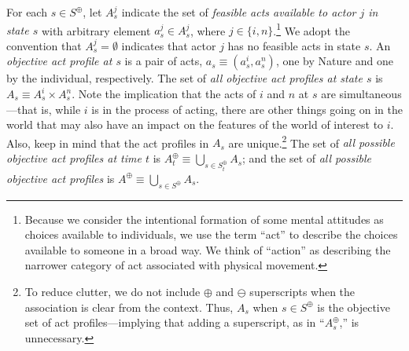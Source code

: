 \documentclass[
11pt,
titlepage,
reqno,
]{article}%
\theoremstyle{definition}
\begin{document}
For each  $s\in S^\oplus$, let $A^j_s$ indicate the set of \textit{feasible acts available to actor $j$ in state $s$} with arbitrary element $a^j_s\in A^j_s$, where $j\in\{i,n\}$.\footnote
{
	Because we consider the intentional formation of some mental attitudes as choices available to individuals, we use the term ``act'' to describe the choices available to someone in a broad way.
	We think of ``action'' as describing the narrower category of act associated with physical movement.
} 
We adopt the convention that $A^j_s=\emptyset$ indicates that actor $j$ has no feasible acts in state $s$.
An \textit{objective act profile at $s$}  is a pair of acts, $a_s\equiv(a^i_s,a^n_s)$, one by Nature and one by the individual, respectively. 
The set of \textit{all objective act profiles at state $s$} is $A_s\equiv A^i_s\times A^n_s$.
Note the implication that the acts of $i$ and $n$ at $s$ are simultaneous---that is, while $i$ is in the process of acting, there are other things going on in the world that may also have an impact on the features of the world of interest to $i$.
Also, keep in mind that the act profiles in $A_s$ are unique.\footnote
{
	To reduce clutter, we do not include $\oplus$ and $\ominus$ superscripts when the association is clear from the context. Thus, $A_s$ when $s\in S^\oplus$ is the objective set of act profiles---implying that adding a superscript, as in ``$A^\oplus_s$,'' is unnecessary.
} 
The set of \textit{all possible objective act profiles at time $t$} is  $A^\oplus_t\equiv \bigcup_{s\in S^\oplus_t} A_s$; and the set of \textit{all possible objective act profiles} is $A^\oplus\equiv \bigcup_{s\in S^\oplus} A_s$.
 
\end{document}
